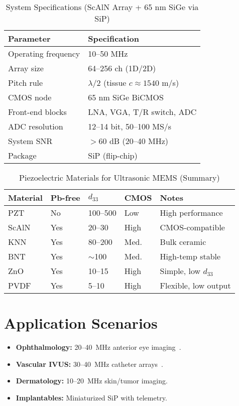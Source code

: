 \documentclass[conference]{IEEEtran}
\begin{document}
\begin{table}[t]
\caption{System Specifications (ScAlN Array + 65 nm SiGe via SiP)}
\label{tab:spec}
\centering
\begin{tabular}{@{}ll@{}}
\toprule
\textbf{Parameter} & \textbf{Specification}\\
\midrule
Operating frequency & 10--50 MHz\\
Array size & 64--256 ch (1D/2D)\\
Pitch rule & $\lambda/2$ (tissue $c\!\approx\!1540$ m/s)\\
CMOS node & 65 nm SiGe BiCMOS\\
Front-end blocks & LNA, VGA, T/R switch, ADC\\
ADC resolution & 12--14 bit, 50--100 MS/s\\
System SNR & $>60$ dB (20--40 MHz)\\
Package & SiP (flip-chip)\\
\bottomrule
\end{tabular}
\end{table}

\begin{table}[t]
\caption{Piezoelectric Materials for Ultrasonic MEMS (Summary)}
\label{tab:mat}
\centering
\begin{tabular}{@{}lllll@{}}
\toprule
Material & Pb-free & $d_{33}$ & CMOS & Notes\\
\midrule
PZT  & No  & 100--500 & Low  & High performance\\
ScAlN& Yes & 20--30   & High & CMOS-compatible\\
KNN  & Yes & 80--200  & Med. & Bulk ceramic\\
BNT  & Yes & $\sim$100& Med. & High-temp stable\\
ZnO  & Yes & 10--15   & High & Simple, low $d_{33}$\\
PVDF & Yes & 5--10    & High & Flexible, low output\\
\bottomrule
\end{tabular}
\end{table}

\section{Application Scenarios}
\begin{itemize}
  \item \textbf{Ophthalmology:} 20--40~MHz anterior eye imaging~\cite{pavlin2009ubm}.
  \item \textbf{Vascular IVUS:} 30--40~MHz catheter arrays~\cite{foster2000ivus}.
  \item \textbf{Dermatology:} 10--20~MHz skin/tumor imaging.
  \item \textbf{Implantables:} Miniaturized SiP with telemetry.
\end{itemize}
\end{document}

